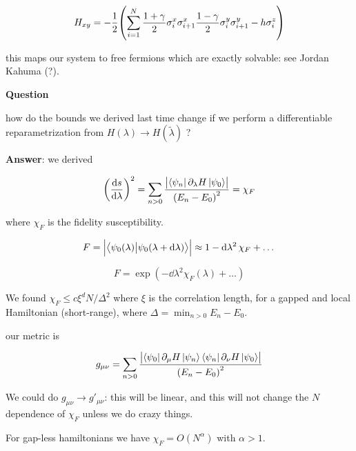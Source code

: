 \documentclass[main.tex]{subfiles}
\begin{document}
\begin{equation}
  H_{xy} = -\frac{1}{2} \qty(\sum _{i=1}   ^{N} \frac{1 + \gamma}{2} \sigma_i ^x \sigma_{i+1}^x \frac{1-\gamma}{2} \sigma^y_i \sigma_{i+1}^y - h \sigma_i^{z} )
\end{equation}

this maps our system to free fermions which are exactly solvable: see Jordan Kahuma (?).

\begin{bluebox}
  \textbf{Question}

  how do the bounds we derived last time change if we perform a differentiable reparametrization from \(H(\lambda) \rightarrow H(\widetilde{\lambda} )\) ?
\end{bluebox}

\textbf{Answer}: we derived

\begin{equation}
    \qty(\dv{s}{\lambda} )^2
    = \sum _{n>0}  \frac{\abs{\bra{\psi_n} \partial_ \lambda H \ket{\psi_0}  } }{\qty(E_n - E_0)^2}
    = \chi_F
\end{equation}

where \( \chi_F \) is the fidelity susceptibility.

\begin{equation}
    F = \abs{\braket{\psi_0 (\lambda)}{\psi_0(\lambda + \dd{\lambda} )}}
    \approx 1 - \dd{\lambda^2} \chi_F + \dots
\end{equation}

\begin{equation}
    F = \exp(- \dd{\lambda^2} \chi_F (\lambda) + \dots )
\end{equation}

We found \(\chi_F \leq c \xi^d N / \Delta^2\) where \(\xi\) is the correlation length, for a gapped and local Hamiltonian (short-range), where \(\Delta = \min_{n>0} E_n - E_0\).

our metric is

\begin{equation}
    g _{\mu \nu} = \sum _{n>0}
    \frac{\abs{\bra{\psi_0} \partial_ \mu H \ket{\psi_n} \bra{\psi_n} \partial_ \nu  H \ket{\psi_0} } }{\qty(E_n - E_0)^2}
\end{equation}

We could  do \(g_{\mu \nu} \rightarrow g' _{\mu \nu}\): this will be linear, and this will not change the \(N\) dependence of \(\chi_F\) unless we do crazy things.

For gap-less hamiltonians we have \(\chi_F = O(N^\alpha) \) with \(\alpha>1\).
\end{document}
